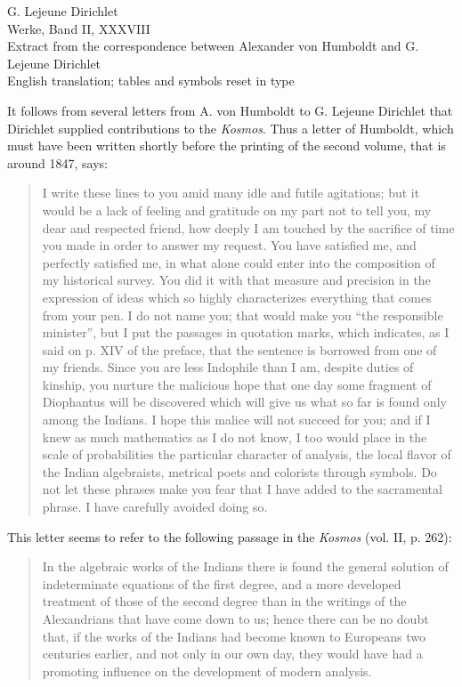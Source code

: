 \documentclass[11pt]{article}
\newcommand{\paperhead}[3]{\begin{center}{\Large G. Lejeune Dirichlet}\\[0.25em]{\large Werke, Band II, #1}\\[0.75em]{\LARGE #2}\\[0.35em]{\large #3}\end{center}\bigskip}
\begin{document}
\paperhead{XXXVIII}{Extract from the correspondence between Alexander von Humboldt and G. Lejeune Dirichlet}{English translation; tables and symbols reset in type}

It follows from several letters from A. von Humboldt to G. Lejeune Dirichlet that Dirichlet supplied contributions to the \emph{Kosmos}. Thus a letter of Humboldt, which must have been written shortly before the printing of the second volume, that is around 1847, says:

\begin{quote}\small
I write these lines to you amid many idle and futile agitations; but it would be a lack of feeling and gratitude on my part not to tell you, my dear and respected friend, how deeply I am touched by the sacrifice of time you made in order to answer my request. You have satisfied me, and perfectly satisfied me, in what alone could enter into the composition of my historical survey. You did it with that measure and precision in the expression of ideas which so highly characterizes everything that comes from your pen. I do not name you; that would make you ``the responsible minister'', but I put the passages in quotation marks, which indicates, as I said on p. XIV of the preface, that the sentence is borrowed from one of my friends. Since you are less Indophile than I am, despite duties of kinship, you nurture the malicious hope that one day some fragment of Diophantus will be discovered which will give us what so far is found only among the Indians. I hope this malice will not succeed for you; and if I knew as much mathematics as I do not know, I too would place in the scale of probabilities the particular character of analysis, the local flavor of the Indian algebraists, metrical poets and colorists through symbols. Do not let these phrases make you fear that I have added to the sacramental phrase. I have carefully avoided doing so.
\end{quote}

This letter seems to refer to the following passage in the \emph{Kosmos} (vol. II, p. 262):

\begin{quote}\small
In the algebraic works of the Indians there is found the general solution of indeterminate equations of the first degree, and a more developed treatment of those of the second degree than in the writings of the Alexandrians that have come down to us; hence there can be no doubt that, if the works of the Indians had become known to Europeans two centuries earlier, and not only in our own day, they would have had a promoting influence on the development of modern analysis.
\end{quote}
\end{document}
